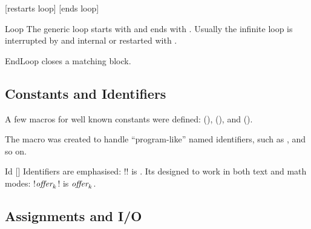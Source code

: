\documentclass[a4paper, 11pt]{article}
\begin{document}
\begin{PDExample}
    \begin{algorithmic}
        \Loop
                \Statep{\Continue}[restarts loop]
            \EndIf
                \Statep{\Break}[ends loop]
            \EndIf
        \EndLoop
    \end{algorithmic}
\end{PDExample}

\begin{Macrodef}{Loop}{}{}
    The generic loop starts with  and ends with . Usually the infinite loop is interrupted by and internal  or restarted with .

    \BlockOptionsText
\end{Macrodef}

\begin{Macrodef}{EndLoop}{}{}
     closes a matching  block.

    \MacroOptionsText
\end{Macrodef}

\subsection{Constants and Identifiers}\label{sec:constants-and-identifiers}
A few macros for well known constants were defined:  (\True),  (\False), and  (\Nil).

The macro  was created to handle ``program-like'' named identifiers, such as ,  and so on.

\begin{Macrodef}{Id}{}{}
    []
    Identifiers are emphasised: \PDInline!! is . Its designed to work in both text and math modes: \PDInline!$\emph{\rmfamily offer}_k$! is $\emph{\rmfamily offer}_k$.
\end{Macrodef}

\subsection{Assignments and I/O}\label{sec:assignments-and-i/o}
\end{document}
